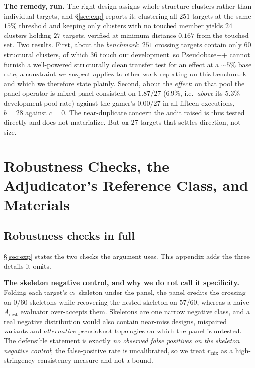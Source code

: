 \documentclass[11pt]{article}
\newcommand{\CF}{\textsc{cf}}
\begin{document}
\smallskip\noindent\textbf{The remedy, run.} The right design assigns whole structure clusters rather than
individual targets, and \S\ref{sec:exp} reports it: clustering all $251$ targets at the
same $15\%$ threshold and keeping only clusters with no touched member yields $24$ clusters holding $27$
targets, verified at minimum distance $0.167$ from the touched set. Two results. First, about the
\emph{benchmark}: $251$ crossing targets contain only $60$ structural clusters, of which $36$ touch our
development, so Pseudobase++ cannot furnish a well-powered structurally clean transfer test for an effect at a
$\sim\!5\%$ base rate, a constraint we suspect applies to other work reporting on this benchmark and which we
therefore state plainly. Second, about the \emph{effect}: on that pool the panel operator is
mixed-panel-consistent on $1.87/27$ ($6.9\%$, i.e.\ \emph{above} its $5.3\%$ development-pool rate) against the
gamer's $0.00/27$ in all fifteen executions, $b{=}28$ against $c{=}0$. The near-duplicate concern the audit
raised is thus tested directly and does not materialize. But on $27$ targets that settles direction, not size.

\section{Robustness Checks, the Adjudicator's Reference Class, and Materials}\label{app:support}

\subsection{Robustness checks in full}\label{app:robust}
\S\ref{sec:exp} states the two checks the argument uses. This appendix adds the three details it omits.

\smallskip\noindent\textbf{The skeleton negative control, and why we do not call it specificity.} Folding each
target's \CF{} skeleton under the panel, the panel credits the crossing on $0/60$ skeletons while recovering the
nested skeleton on $57/60$, whereas a naive $A_{\mathrm{nest}}$ evaluator over-accepts them. Skeletons are one
narrow negative class, and a real negative distribution would also contain near-miss designs, mispaired
variants and \emph{alternative} pseudoknot topologies on which the panel is untested. The defensible statement
is exactly \emph{no observed false positives on the skeleton negative control}; the false-positive rate is uncalibrated, so we treat $r_{\mathrm{mix}}$ as a high-stringency consistency measure and not a bound.
\end{document}
